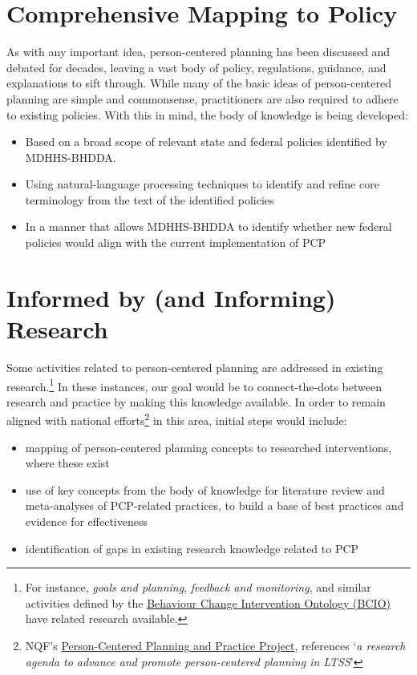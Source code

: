 \documentclass[
]{book}
\providecommand{\tightlist}{%
  \setlength{\itemsep}{0pt}\setlength{\parskip}{0pt}}
\begin{document}
\hypertarget{policy}{%
\chapter{Comprehensive Mapping to Policy}\label{policy}}

As with any important idea, person-centered planning has been discussed and debated for decades, leaving a vast body of policy, regulations, guidance, and explanations to sift through. While many of the basic ideas of person-centered planning are simple and commonsense, practitioners are also required to adhere to existing policies. With this in mind, the body of knowledge is being developed:

\begin{itemize}
\tightlist
\item
  Based on a broad scope of relevant state and federal policies identified by MDHHS-BHDDA.
\item
  Using natural-language processing techniques to identify and refine core terminology from the text of the identified policies
\item
  In a manner that allows MDHHS-BHDDA to identify whether new federal policies would align with the current implementation of PCP
\end{itemize}

\hypertarget{research}{%
\chapter{Informed by (and Informing) Research}\label{research}}

Some activities related to person-centered planning are addressed in existing research.\footnote{For instance, \emph{goals and planning}, \emph{feedback and monitoring}, and similar activities defined by the \href{https://www.humanbehaviourchange.org/resources/behavioural-science/25/description}{Behaviour Change Intervention Ontology (BCIO)} have related research available.} In these instances, our goal would be to connect-the-dots between research and practice by making this knowledge available. In order to remain aligned with national efforts\footnote{NQF's \href{http://www.qualityforum.org/WorkArea/linkit.aspx?LinkIdentifier=id\&ItemID=91382}{Person-Centered Planning and Practice Project}, references `\emph{a research agenda to advance and promote person-centered planning in LTSS}'} in this area, initial steps would include:

\begin{itemize}
\tightlist
\item
  mapping of person-centered planning concepts to researched interventions, where these exist
\item
  use of key concepts from the body of knowledge for literature review and meta-analyses of PCP-related practices, to build a base of best practices and evidence for effectiveness
\item
  identification of gaps in existing research knowledge related to PCP
\end{itemize}
\end{document}
